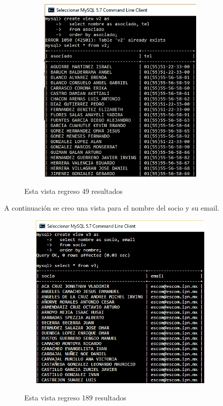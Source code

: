 \documentclass[12pt, titlepage]{article}
\begin{document}
	\begin{figure}[H]
		\begin{center}
			\includegraphics[width=10cm, height=9cm]{img/v2.png}
			\label{fig:v2}
			\caption{Esta vista regreso 49 resultados}
		\end{center}
	\end{figure}
	
	A continuación se creo una vista para el nombre del socio y su email.
	\begin{figure}[H]
		\begin{center}
			\includegraphics[width=10cm, height=8.5cm]{img/v3.png}
			\label{fig:v3}
			\caption{Esta vista regreso 189 resultados}
		\end{center}
	\end{figure}
	
\end{document}
